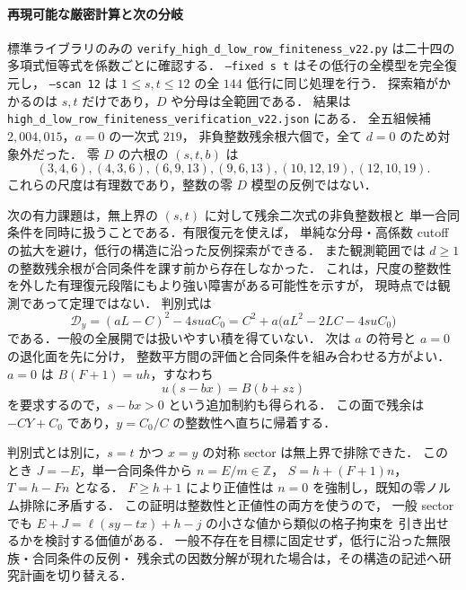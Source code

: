 \paragraph{再現可能な厳密計算と次の分岐}

標準ライブラリのみの
\nolinkurl{verify_high_d_low_row_finiteness_v22.py}
は二十四の多項式恒等式を係数ごとに確認する．
\texttt{--fixed s t} はその低行の全模型を完全復元し，
\texttt{--scan 12} は $1\le s,t\le12$ の全 $144$ 低行に同じ処理を行う．
探索箱がかかるのは $s,t$ だけであり，$D$ や分母は全範囲である．
結果は \nolinkurl{high_d_low_row_finiteness_verification_v22.json} にある．
全五組候補 $2{,}004{,}015$，$a=0$ の一次式 $219$，
非負整数残余根六個で，全て $d=0$ のため対象外だった．
零 $D$ の六根の $(s,t,b)$ は
\[
 (3,4,6),(4,3,6),(6,9,13),(9,6,13),(10,12,19),(12,10,19).
\]
これらの尺度は有理数であり，整数の零 $D$ 模型の反例ではない．

次の有力課題は，無上界の $(s,t)$ に対して残余二次式の非負整数根と
単一合同条件を同時に扱うことである．有限復元を使えば，
単純な分母・高係数 cutoff の拡大を避け，低行の構造に沿った反例探索ができる．
また観測範囲では $d\ge1$ の整数残余根が合同条件を課す前から存在しなかった．
これは，尺度の整数性を外した有理復元段階にもより強い障害がある可能性を示すが，
現時点では観測であって定理ではない．
判別式は
\[
 \mathcal D_y=(aL-C)^2-4suaC_0
 =C^2+a\bigl(aL^2-2LC-4suC_0\bigr)
\]
である．一般の全展開では扱いやすい積を得ていない．
次は $a$ の符号と $a=0$ の退化面を先に分け，
整数平方間の評価と合同条件を組み合わせる方がよい．
$a=0$ は $B(F+1)=uh$，すなわち
\[
 u(s-bx)=B(b+sz)
\]
を要求するので，$s-bx>0$ という追加制約も得られる．
この面で残余は $-CY+C_0$ であり，$y=C_0/C$ の整数性へ直ちに帰着する．

判別式とは別に，$s=t$ かつ $x=y$ の対称 sector は無上界で排除できた．
このとき $J=-E$，単一合同条件から $n=E/m\in\mathbb Z$，
$S=h+(F+1)n$，$T=h-Fn$ となる．
$F\ge h+1$ により正値性は $n=0$ を強制し，既知の零ノルム排除に矛盾する．
この証明は整数性と正値性の両方を使うので，
一般 sector でも $E+J=\ell(sy-tx)+h-j$ の小さな値から類似の格子拘束を
引き出せるかを検討する価値がある．
一般不存在を目標に固定せず，低行に沿った無限族・合同条件の反例・
残余式の因数分解が現れた場合は，その構造の記述へ研究計画を切り替える．
